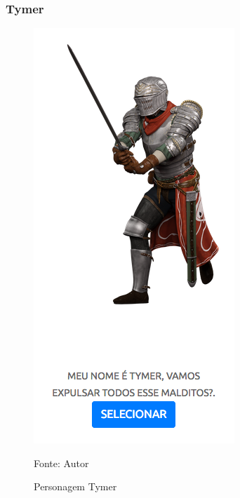 \subsubsection{Tymer}
\begin{figure}[h]
	\centering
	\includegraphics[keepaspectratio=true,scale=0.6]{figuras/tymer.png}
	\caption{Personagem Tymer}
	Fonte: Autor
	\label{tymer}
\end{figure}
\clearpage
